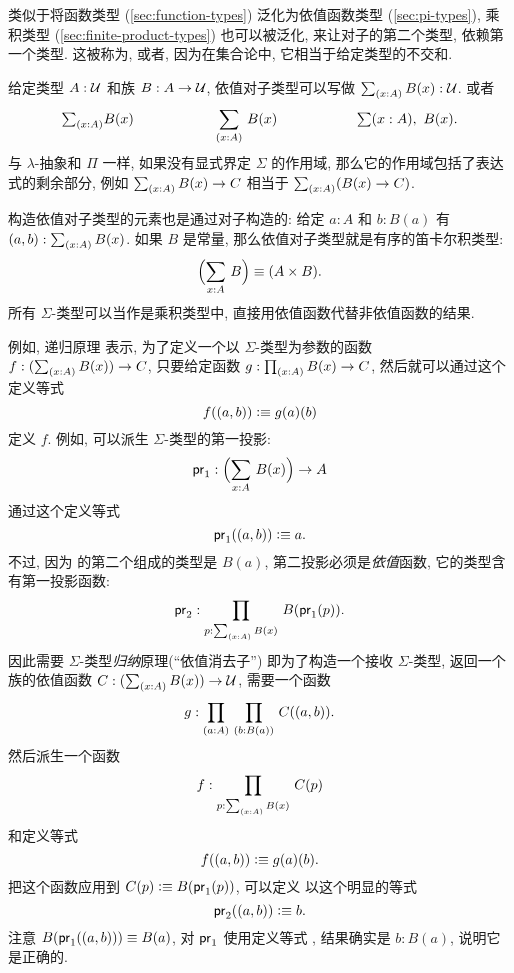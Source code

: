 %
%
%
%
%

类似于将函数类型 (\cref{sec:function-types}) 泛化为依值函数类型 (\cref{sec:pi-types}), 乘积类型 (\cref{sec:finite-product-types}) 也可以被泛化, 来让对子的第二个类型, 依赖第一个类型.
这被称为, 或者, 因为在集合论中, 它相当于给定类型的不交和.

给定类型 $A:\mathcal{U}$ 和族 $B : A \to \mathcal{U}$, 依值对子类型可以写做 $\sm{x:A} B(x) : \UU$.
或者
\[
    \tsm{x:A} B(x) \hspace{2cm} \dsm{x:A}B(x) \hspace{2cm} \lsm{x:A} B(x).
\]
与 $\lambda$-抽象和 $\Pi$ 一样, 如果没有显式界定 $\Sigma$ 的作用域, 那么它的作用域包括了表达式的剩余部分, 例如 $\sm{x:A} B(x) \to C$ 相当于 $\sm{x:A} (B(x) \to C)$.

%
%
构造依值对子类型的元素也是通过对子构造的: 给定 $a:A$ 和 $b:B(a)$ 有 $\tup{a}{b} : \sm{x:A} B(x)$.
如果 $B$ 是常量, 那么依值对子类型就是有序的笛卡尔积类型:
\[
    \Parens{\sm{x:A} B} \jdeq (A \times B).
\]
所有 $\Sigma$-类型可以当作是乘积类型中, 直接用依值函数代替非依值函数的结果.

例如, 递归原理%
表示, 为了定义一个以 $\Sigma$-类型为参数的函数 $f : (\sm{x:A} B(x)) \to C$, 只要给定函数  $g : \prd{x:A} B(x) \to C$, 然后就可以通过这个定义等式
\[
    f((a,b)) \vcentcolon\equiv g(a)(b)
\]
定义 $f$.
%
例如, 可以派生 $\Sigma$-类型的第一投影:
%
\begin{equation*}
    \fst : \Parens{\sm{x : A}B(x)} \to A
\end{equation*}
通过这个定义等式
\begin{equation*}
    \mathsf{pr}_{1}((a,b)) \vcentcolon\equiv a.
\end{equation*}
不过, 因为
的第二个组成的类型是 $B(a)$, 第二投影必须是\emph{依值}函数, 它的类型含有第一投影函数:
%
\[
    \snd : \prd{p:\sm{x : A}B(x)}B(\fst(p)).
\]
因此需要 $\Sigma$-类型\emph{归纳}原理(``依值消去子'')
即为了构造一个接收 $\Sigma$-类型, 返回一个族的依值函数 $C : (\sm{x:A} B(x)) \to \UU$, 需要一个函数
\[
    g : \prd{a:A}{b:B(a)} C(\tup{a}{b}).
\]
然后派生一个函数
\[
    f : \prd{p : \sm{x:A}B(x)} C(p)
\]
和定义等式
\[
    f((a,b)) \vcentcolon\equiv g(a)(b).
\]
把这个函数应用到 $C(p)\vcentcolon\equiv B(\mathsf{pr}_{1}(p))$, 可以定义
以这个明显的等式
\[
    \mathsf{pr}_{2}((a,b)) \vcentcolon\equiv b.
\]
注意 $B (\mathsf{pr}_{1}((a,b))) \equiv B(a)$, 对 $\mathsf{pr}_{1}$ 使用定义等式 , 结果确实是 $b : B(a)$, 说明它是正确的.

